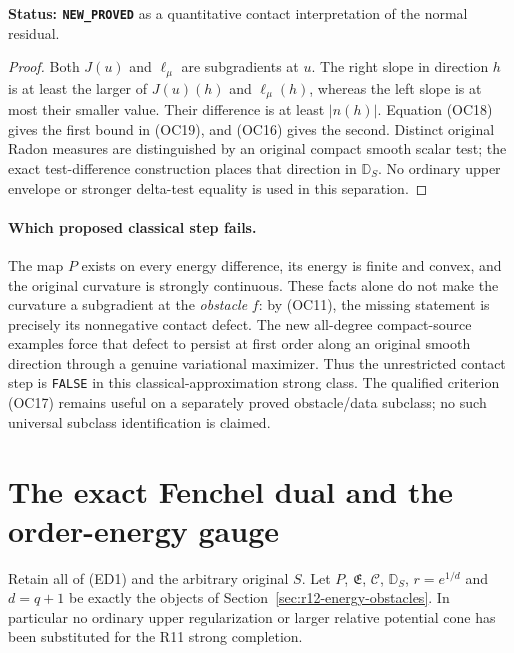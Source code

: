 \documentclass[11pt,a4paper]{article}
\numberwithin{equation}{section}
\theoremstyle{definition}
\theoremstyle{remark}
\begin{document}
\noindent\textbf{Status: \texttt{NEW\_PROVED}} as a
quantitative contact interpretation of the normal residual.

\begin{proof}
Both $J(u)$ and $\ell_\mu$ are subgradients at $u$.
The right slope in direction $h$ is at least the larger of
$J(u)(h)$ and $\ell_\mu(h)$, whereas the left slope is at
most their smaller value.  Their difference is at least
$|n(h)|$.  Equation \textup{(OC18)} gives the first bound
in \textup{(OC19)}, and \textup{(OC16)} gives the second.
Distinct original Radon measures are distinguished by an
original compact smooth scalar test; the exact test-difference
construction places that direction in $\mathbb D_S$.
No ordinary upper envelope or stronger delta-test equality
is used in this separation.
\end{proof}

\paragraph{Which proposed classical step fails.}
The map $P$ exists on every energy difference, its energy is
finite and convex, and the original curvature is strongly
continuous.  These facts alone do not make the curvature a
subgradient at the \emph{obstacle} $f$: by \textup{(OC11)},
the missing statement is precisely its nonnegative contact
defect.  The new all-degree compact-source examples force
that defect to persist at first order along an original
smooth direction through a genuine variational maximizer.
Thus the unrestricted contact step is \texttt{FALSE} in
this classical-approximation strong class.  The qualified
criterion \textup{(OC17)} remains useful on a separately
proved obstacle/data subclass; no such universal subclass
identification is claimed.



\section{The exact Fenchel dual and the order-energy gauge}
\label{sec:r12-Fenchel-order-gauge}

Retain all of \textup{(ED1)} and the arbitrary original $S$.
Let $P$, $\mathfrak E$, $\mathscr C$, $\mathbb D_S$,
$r=e^{1/d}$ and $d=q+1$ be exactly the objects of
Section~\ref{sec:r12-energy-obstacles}.  In particular no
ordinary upper regularization or larger relative potential
cone has been substituted for the R11 strong completion.
\end{document}
